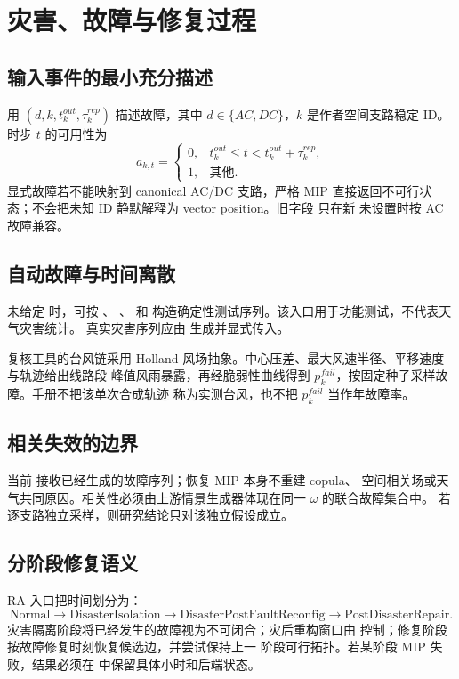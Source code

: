 \section{灾害、故障与修复过程}\label{sec:res-hazard}

\subsection{输入事件的最小充分描述}
 用
$(d,k,t_k^{out},\tau_k^{rep})$ 描述故障，其中 $d\in\{AC,DC\}$，$k$ 是作者空间支路稳定
ID。时步 $t$ 的可用性为
\begin{equation}
 a_{k,t}=\begin{cases}
 0,&t_k^{out}\le t<t_k^{out}+\tau_k^{rep},\\
 1,&\text{其他}.
 \end{cases}
\end{equation}
显式故障若不能映射到 canonical AC/DC 支路，严格 MIP 直接返回不可行状态；不会把未知 ID
静默解释为 vector position。旧字段  只在新
 未设置时按 AC 故障兼容。

\subsection{自动故障与时间离散}
未给定  时，可按 、
、 和
 构造确定性测试序列。该入口用于功能测试，不代表天气灾害统计。
真实灾害序列应由  生成并显式传入。

复核工具的台风链采用 Holland 风场抽象。中心压差、最大风速半径、平移速度与轨迹给出线路段
峰值风雨暴露，再经脆弱性曲线得到 $p_k^{fail}$，按固定种子采样故障。手册不把该单次合成轨迹
称为实测台风，也不把 $p_k^{fail}$ 当作年故障率。

\subsection{相关失效的边界}
当前  接收已经生成的故障序列；恢复 MIP 本身不重建 copula、
空间相关场或天气共同原因。相关性必须由上游情景生成器体现在同一 $\omega$ 的联合故障集合中。
若逐支路独立采样，则研究结论只对该独立假设成立。

\subsection{分阶段修复语义}
RA 入口把时间划分为：
\begin{equation}
 \text{Normal}\rightarrow\text{DisasterIsolation}\rightarrow
 \text{DisasterPostFaultReconfig}\rightarrow\text{PostDisasterRepair}.
\end{equation}
灾害隔离阶段将已经发生的故障视为不可闭合；灾后重构窗口由
 控制；修复阶段按故障修复时刻恢复候选边，并尝试保持上一
阶段可行拓扑。若某阶段 MIP 失败，结果必须在  中保留具体小时和后端状态。


